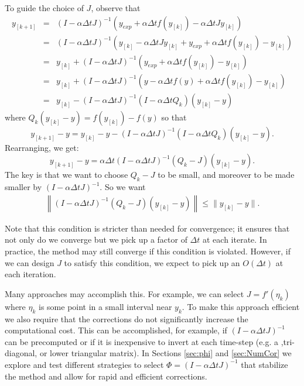 \documentclass{siamart251104}
\newcommand{\dt}{\Delta t}
\begin{document}
To guide the choice of $J$, observe that
\begin{eqnarray*} 
 y_{[k+1]}  &= & \left( I - \alpha \dt J \right)^{-1} 
 \left( y_{exp}  + \alpha \dt f(y_{[k]}) -   \alpha \dt J y_{[k]} \right) \\
 &= &  \left( I - \alpha \dt J\right)^{-1} 
  \left( y_{[k]} -   \alpha \dt J y_{[k]} + y_{exp}  + \alpha \dt f(y_{[k]}) -y_{[k]} \right) \\
&= &   y_{[k]}
 + \left( I - \alpha \dt J \right)^{-1}
 \left(y_{exp}  + \alpha \dt f(y_{[k]}) -  y_{[k]}
 \right)  \\
&= & y_{[k]}
 + \left( I - \alpha \dt J\right)^{-1}
 \left(y - \alpha \dt f(y) + \alpha \dt f(y_{[k]}) -  y_{[k]}
 \right)  \\
 &= & y_{[k]}
 - \left( I - \alpha \dt J \right)^{-1}
 \left( I - \alpha \dt Q_k \right) \left(y_{[k]}-y\right) 
\end{eqnarray*}
where $Q_k (y_{[k]}-y) = f(y_{[k]})-f(y) $ so that
\[  y_{[k+1]}  - y = y_{[k]} - y 
- \left( I - \alpha \dt J \right)^{-1}
 \left( I - \alpha \dt Q_k \right) \left(y_{[k]}-y\right).
\]
Rearranging, we get:
\[  y_{[k+1]}  - y = 
 \alpha \dt  \left( I - \alpha \dt J \right)^{-1}
 \left( Q_k - J \right) \left(y_{[k]}-y\right) .\]
The key is that we want to choose $Q_k-J $ to be small,
and moreover to be made smaller by 
$\left( I - \alpha \dt J \right)^{-1}$.
So we want
\begin{eqnarray} \label{CorCondition}
    \left\| \left( I - \alpha \dt J \right)^{-1} \left( Q_k - J \right) 
\left(y_{[k]}-y\right) \right\| \leq \| y_{[k]}-y \|.
\end{eqnarray} 

Note that this condition is stricter than needed for convergence; it ensures that not only do we converge but we pick up a factor of $\dt$ at each iterate. 
In practice, the method may still converge if this 
condition is violated. However, if we can design $J$ to satisfy this condition, we expect to pick up an $O(\dt)$
at each iteration.

Many approaches may accomplish this. For example,
we can select $J = f'(\eta_k)$ where $\eta_k$ is  
some point in a small interval near $y_k$. 
To make this approach efficient  we also require that the  corrections 
do not significantly increase the computational cost.  This can be accomplished,
for example, if $(I - \alpha \dt J)^{-1}$ can be precomputed or if it is  inexpensive to invert at each time-step (e.g. a ,tri-diagonal, or lower triangular matrix).
In  Sections \ref{sec:phi} and  \ref{sec:NumCor} we explore and test different strategies to select 
$\Phi = \left( I - \alpha \dt J \right)^{-1}$ 
that  stabilize the method and allow for rapid and efficient corrections.
\end{document}
